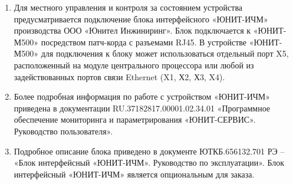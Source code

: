 \begin{enumerate}[label=\arabic{section}.\arabic{subsection}.\arabic*, labelsep=4pt, leftmargin=0pt, itemindent=57pt]

\item
Для местного управления и контроля за состоянием устройства предусматривается подключение блока интерфейсного «ЮНИТ-ИЧМ» производства ООО «Юнител Инжиниринг». Блок подключается к «ЮНИТ-М500» посредством патч-корда с разъемами RJ45. В устройстве «ЮНИТ-М500» для подключения к блоку может использоваться отдельный порт X5, расположенный на модуле центрального процессора или любой из задействованных портов связи Ethernet (X1, Х2, Х3, X4).
\item
Более подробная информация по работе с устройством «ЮНИТ-ИЧМ» приведена в документации RU.37182817.00001.02.34.01 «Программное обеспечение мониторинга и параметрирования «ЮНИТ-СЕРВИС». Руководство пользователя».

\item
Подробное описание блока приведено в документе ЮТКБ.656132.701 РЭ – «Блок интерфейсный «ЮНИТ-ИЧМ». Руководство по эксплуатации». Блок интерфейсный «ЮНИТ-ИЧМ» является опциональным для заказа.

\end{enumerate}